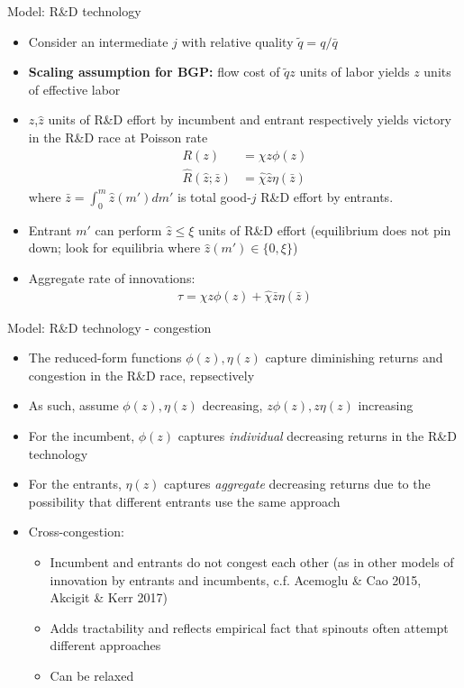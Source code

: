 \documentclass[english,usenames,dvipsnames]{beamer}
\begin{document}
\begin{frame}{Model: R\&D technology}
\begin{itemize}
	\small
	\item Consider an intermediate $j$ with relative quality $\tilde{q} = q / \bar{q}$
	\item \textbf{Scaling assumption for BGP:} flow cost of $\tilde{q}z$ units of labor yields $z$ units of effective labor 
	\item $z$,$\hat{z}$ units of R\&D effort by incumbent and entrant respectively yields victory in the R\&D race at Poisson rate
	\begin{align*}
	R(z) &= \chi z \phi(z) \\
	\hat{R}(\hat{z};\bar{z}) &= \hat{\chi} \hat{z} \eta(\bar{z}) 
	\end{align*}
	where $\bar{z} = \int_0^{m} \hat{z}(m')dm'$ is total good-$j$ R\&D effort by entrants.
	\item Entrant $m'$ can perform $\hat{z}\le\xi$ units of R\&D effort (equilibrium does not pin down; look for equilibria where $\hat{z}(m') \in \{0,\xi \}$)
	\item Aggregate rate of innovations:
	\begin{align*}
	\tau = \chi z \phi(z) + \hat{\chi} \bar{z} \eta(\bar{z})
	\end{align*}
\end{itemize}
\end{frame}

\begin{frame}{Model: R\&D technology - congestion}
\begin{itemize}
	\item The reduced-form functions $\phi(z),\eta(z)$ capture diminishing returns and congestion in the R\&D race, repsectively
	\item As such, assume $\phi(z),\eta(z)$ decreasing, $z\phi(z),z\eta(z)$ increasing
	\item For the incumbent, $\phi(z)$ captures \textit{individual} decreasing returns in the R\&D technology
	\item For the entrants, $\eta(z)$ captures \textit{aggregate} decreasing returns due to the possibility that different entrants use the same approach 
	\item Cross-congestion:
	\begin{itemize}
		\item Incumbent and entrants do not congest each other (as in other models of innovation by entrants and incumbents, c.f. Acemoglu \& Cao 2015, Akcigit \& Kerr 2017)
		\item Adds tractability and reflects empirical fact that spinouts often attempt different approaches
		\item Can be relaxed
	\end{itemize}
\end{itemize}
\end{frame}
\end{document}
